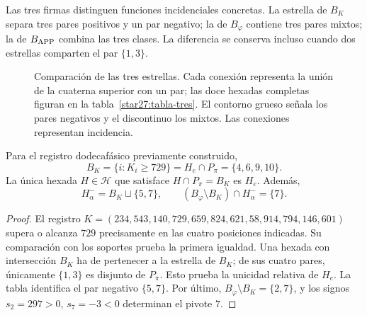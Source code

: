Las tres firmas distinguen funciones incidenciales concretas. La
estrella de \(B_K\) separa tres pares positivos y un par negativo; la
de \(B_\varphi\) contiene tres pares mixtos; la de \(B_{\rm APP}\)
combina las tres clases. La diferencia se conserva incluso cuando
dos estrellas comparten el par \(\{1,3\}\).

\begin{figure}[htbp]
\centering
{}
\caption{Comparación de las tres estrellas. Cada conexión representa
la unión de la cuaterna superior con un par; las doce hexadas
completas figuran en la tabla~\ref{star27:tabla-tres}. El contorno
grueso señala los pares negativos y el discontinuo los mixtos.
Las conexiones representan incidencia.}
\label{star27:figura}
\end{figure}

\begin{proposition}
\label{star27:acoplamiento}
Para el registro dodecafásico previamente construido,
\[
B_K=\{i:K_i\geq729\}=H_e\cap P_\pi=\{4,6,9,10\}.
\]
La única hexada \(H\in\mathcal H\) que satisface
\(H\cap P_\pi=B_K\) es \(H_e\). Además,
\[
H^-_\alpha=B_K\sqcup\{5,7\},\qquad
(B_\varphi\setminus B_K)\cap H^-_\alpha=\{7\}.
\]
\end{proposition}

\begin{proof}
El registro
\(K=(234,543,140,729,659,824,621,58,914,794,146,601)\)
supera o alcanza \(729\) precisamente en las cuatro posiciones
indicadas. Su comparación con los soportes prueba la primera
igualdad. Una hexada con intersección \(B_K\) ha de pertenecer a la
estrella de \(B_K\); de sus cuatro pares, únicamente \(\{1,3\}\) es
disjunto de \(P_\pi\). Esto prueba la unicidad relativa de \(H_e\).
La tabla identifica el par negativo \(\{5,7\}\). Por último,
\(B_\varphi\setminus B_K=\{2,7\}\), y los signos
\(s_2=297>0\), \(s_7=-3<0\) determinan el pivote \(7\).
\end{proof}

